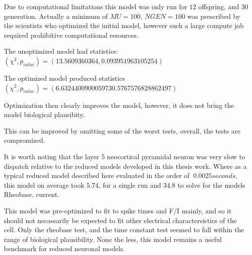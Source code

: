 Due to computational limitations this model was only run for 
$12$ offspring, and $30$ generation. Actually a minimum of $MU=100$, $NGEN =100$ was prescribed by the scientists who optimized the initial model, however such a large compute job required prohibitive computational resources.


The unoptimized model had statistics:
$(\chi^{2},p_{value})=(13.5609360364, 0.093951963105254)$

The optimized model produced statistics
$(\chi^{2},p_{value})=(6.632440090005973 0.5767576828862497)$

Optimization then clearly improves the model, however, it does not bring the model  biological plausibity.





This can be improved by omitting some of the worst tests, overall, the tests are compromized.



It is worth noting that the layer 5 neocortical pyramidal neuron was very slow to dispatch relative to the reduced models developed in this thesis work. Where as a typical reduced model described here evaluated in the order of $~0.0025 seconds$, this model on average took $5.74$, for a single run and $34.8$ to solve for the models Rheobase, current.

This model was pre-optimized to fit to spike times and F/I mainly, and so it should not necassarily be expected to fit other electrical charactersistics of the cell. Only the rheobase test, and the time constant test seemed to fall within the range of biological plausibility.
None the less, this model remains a useful benchmark for reduced neuronal models.
